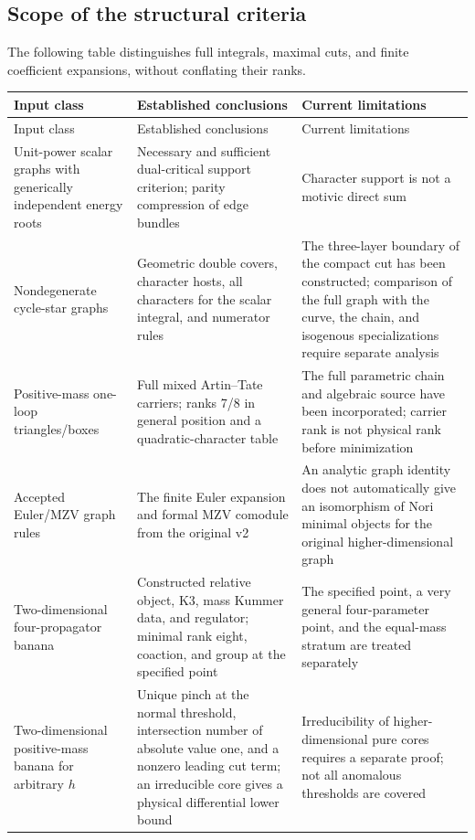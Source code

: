 \documentclass[11pt,a4paper,oneside]{article}
\theoremstyle{plain}
\theoremstyle{definition}
\theoremstyle{remark}
\numberwithin{equation}{section}
\begin{document}
\subsection{Scope of the structural criteria}
The following table distinguishes full integrals, maximal cuts, and finite coefficient expansions, without conflating their ranks.
\begin{center}\small
\begin{longtable}{>{\raggedright\arraybackslash}p{29mm}>{\raggedright\arraybackslash}p{51mm}>{\raggedright\arraybackslash}p{61mm}}
\toprule Input class&Established conclusions&Current limitations\\\midrule\endfirsthead
\toprule Input class&Established conclusions&Current limitations\\\midrule\endhead
Unit-power scalar graphs with generically independent energy roots&
Necessary and sufficient dual-critical support criterion; parity compression of edge bundles&
Character support is not a motivic direct sum\\
Nondegenerate cycle-star graphs&
Geometric double covers, character hosts, all characters for the scalar integral, and numerator rules&
The three-layer boundary of the compact cut has been constructed; comparison of the full graph with the curve, the chain, and isogenous specializations require separate analysis\\
Positive-mass one-loop triangles/boxes&
Full mixed Artin--Tate carriers; ranks 7/8 in general position and a quadratic-character table&
The full parametric chain and algebraic source have been incorporated; carrier rank is not physical rank before minimization\\
Accepted Euler/MZV graph rules&
The finite Euler expansion and formal MZV comodule from the original v2&
An analytic graph identity does not automatically give an isomorphism of Nori minimal objects for the original higher-dimensional graph\\
Two-dimensional four-propagator banana&
Constructed relative object, K3, mass Kummer data, and regulator; minimal rank eight, coaction, and group at the specified point&
The specified point, a very general four-parameter point, and the equal-mass stratum are treated separately\\
Two-dimensional positive-mass banana for arbitrary $h$&
Unique pinch at the normal threshold, intersection number of absolute value one, and a nonzero leading cut term; an irreducible core gives a physical differential lower bound&
Irreducibility of higher-dimensional pure cores requires a separate proof; not all anomalous thresholds are covered\\

\end{longtable}
\end{center}
\end{document}
